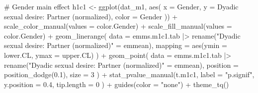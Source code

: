 \documentclass[
  bookmarksnumbered]{article}
\newenvironment{Shaded}{\begin{snugshade}}{\end{snugshade}}
\newcommand{\AttributeTok}[1]{\textcolor[rgb]{0.80,0.80,0.80}{#1}}
\newcommand{\CommentTok}[1]{\textcolor[rgb]{0.50,0.62,0.50}{#1}}
\newcommand{\DecValTok}[1]{\textcolor[rgb]{0.86,0.86,0.80}{#1}}
\newcommand{\FloatTok}[1]{\textcolor[rgb]{0.75,0.75,0.82}{#1}}
\newcommand{\FunctionTok}[1]{\textcolor[rgb]{0.94,0.94,0.56}{#1}}
\newcommand{\NormalTok}[1]{\textcolor[rgb]{0.80,0.80,0.80}{#1}}
\newcommand{\OtherTok}[1]{\textcolor[rgb]{0.94,0.94,0.56}{#1}}
\newcommand{\SpecialCharTok}[1]{\textcolor[rgb]{0.86,0.64,0.64}{#1}}
\newcommand{\StringTok}[1]{\textcolor[rgb]{0.80,0.58,0.58}{#1}}
\begin{document}
\begin{Shaded}
\begin{Highlighting}[]
\CommentTok{\# Gender main effect}
\NormalTok{h1c1 }\OtherTok{\textless{}{-}} \FunctionTok{ggplot}\NormalTok{(dat\_m1, }\FunctionTok{aes}\NormalTok{(}
  \AttributeTok{x =}\NormalTok{ Gender, }\AttributeTok{y =} \StringTok{\textasciigrave{}}\AttributeTok{Dyadic sexual desire: Partner (normalized)}\StringTok{\textasciigrave{}}\NormalTok{,}
  \AttributeTok{color =}\NormalTok{ Gender}
\NormalTok{)) }\SpecialCharTok{+}
  \FunctionTok{scale\_color\_manual}\NormalTok{(}\AttributeTok{values =}\NormalTok{ color.Gender) }\SpecialCharTok{+}
  \FunctionTok{scale\_fill\_manual}\NormalTok{(}\AttributeTok{values =}\NormalTok{ color.Gender) }\SpecialCharTok{+}
  \FunctionTok{geom\_linerange}\NormalTok{(}
    \AttributeTok{data =}\NormalTok{ emms.m1c1.tab }\SpecialCharTok{|\textgreater{}}
      \FunctionTok{rename}\NormalTok{(}\StringTok{"Dyadic sexual desire: Partner (normalized)"} \OtherTok{=}\NormalTok{ emmean),}
    \AttributeTok{mapping =} \FunctionTok{aes}\NormalTok{(}\AttributeTok{ymin =}\NormalTok{ lower.CL, }\AttributeTok{ymax =}\NormalTok{ upper.CL)}
\NormalTok{  ) }\SpecialCharTok{+}
  \FunctionTok{geom\_point}\NormalTok{(}
    \AttributeTok{data =}\NormalTok{ emms.m1c1.tab }\SpecialCharTok{|\textgreater{}}
      \FunctionTok{rename}\NormalTok{(}\StringTok{"Dyadic sexual desire: Partner (normalized)"} \OtherTok{=}\NormalTok{ emmean),}
    \AttributeTok{position =} \FunctionTok{position\_dodge}\NormalTok{(}\FloatTok{0.1}\NormalTok{),}
    \AttributeTok{size =} \DecValTok{3}
\NormalTok{  ) }\SpecialCharTok{+}
  \FunctionTok{stat\_pvalue\_manual}\NormalTok{(t.m1c1,}
    \AttributeTok{label =} \StringTok{"p.signif"}\NormalTok{,}
    \AttributeTok{y.position =} \FloatTok{0.4}\NormalTok{,}
    \AttributeTok{tip.length =} \DecValTok{0}
\NormalTok{  ) }\SpecialCharTok{+}
  \FunctionTok{guides}\NormalTok{(}\AttributeTok{color =} \StringTok{"none"}\NormalTok{) }\SpecialCharTok{+}
  \FunctionTok{theme\_tq}\NormalTok{()}


\end{Highlighting}
\end{Shaded}
\end{document}
